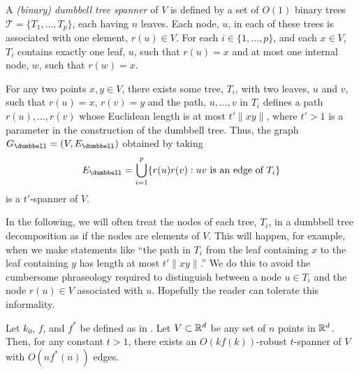 \documentclass{patmorin}
\begin{document}
A \emph{(binary) dumbbell tree spanner} of $V$ is defined by a set of
$O(1)$ binary trees $\mathcal{T}=\{T_1,\ldots,T_p\}$, each having $n$
leaves.  Each node, $u$, in each of these trees is associated with one
element, $r(u)\in V$.  For each $i\in\{1,\ldots,p\}$, and each $x\in V$,
$T_i$ contains exactly one leaf, $u$, such that $r(u)=x$ and at most
one internal node, $w$, such that $r(w)=x$.

For any two points $x,y\in V$, there exists some tree, $T_i$,
with two leaves, $u$ and $v$, such that $r(u)=x$, $r(v)=y$ and
the path, $u,\ldots,v$ in $T_i$ defines a path $r(u),\ldots,r(v)$
whose Euclidean length is at most $t'\|xy\|$, where $t'>1$ is a
parameter in the construction of the dumbbell tree.  Thus, the graph
$G_\dumbbell=(V,E_\dumbbell)$ obtained by taking
\[
   E_\dumbbell = \bigcup_{i=1}^p\{r(u)r(v) : \text{$uv$ is an edge of $T_i$} \}
\]
is a $t'$-spanner of $V$.  

In the following, we will often treat the nodes of each tree, $T_i$,
in a dumbbell tree decomposition as if the nodes are elements of $V$.
This will happen, for example, when we make statements like ``the path in
$T_i$ from the leaf containing $x$ to the leaf containing $y$ has length
at most $t'\|xy\|$.''  We do this to avoid the cumbersome phraseology
required to distinguish between a node $u\in T_i$ and the node $r(u)\in V$
associated with $u$.  Hopefully the reader can tolerate this informality.

\begin{thm}
  Let $k_0$, $f$, and $f^*$ be defined as in .
  Let $V\subset \mathbb{R}^d$ be any set of $n$ points in $\mathbb{R}^d$.  Then, for any
  constant $t>1$,  there exists an $O(kf(k))$-robust $t$-spanner of $V$
  with $O(nf^*(n))$ edges.
\end{thm}
\end{document}

